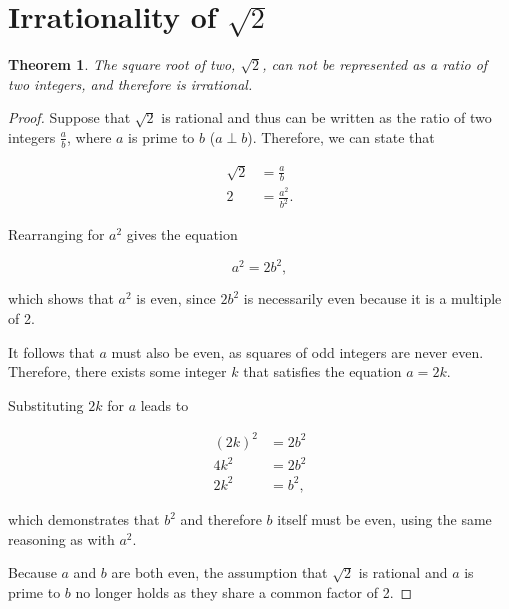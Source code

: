 \documentclass[parskip]{scrartcl}
\newtheorem{theorem}{Theorem}
\begin{document}
\section{Irrationality of \(\sqrt{2}\)}

\begin{theorem}
The square root of two, \(\sqrt{2}\), can not be represented as a ratio of two
integers, and therefore is irrational.
\end{theorem}

\begin{proof}
Suppose that \(\sqrt{2}\) is rational and thus can be written as the ratio of
two integers \(\frac{a}{b}\), where \(a\) is prime to \(b\) (\(a ⟂
b\)). Therefore, we can state that

\begin{align*}
  \sqrt{2} &= \frac{a}{b} \\
  2 &= \frac{a^2}{b^2}.
\end{align*}

Rearranging for \(a^2\) gives the equation

\begin{equation*}
  a^2 = 2b^2,
\end{equation*}

which shows that \(a^2\) is even, since \(2b^2\) is necessarily even because it
is a multiple of 2.

It follows that \(a\) must also be even, as squares of odd integers are never
even. Therefore, there exists some integer \(k\) that satisfies the equation \(a
= 2k\).

Substituting \(2k\) for \(a\) leads to

\begin{align*}
  {(2k)}^2 &= 2b^2 \\
  4k^2 &= 2b^2 \\
  2k^2 &= b^2,
\end{align*}

which demonstrates that \(b^2\) and therefore \(b\) itself must be even, using
the same reasoning as with \(a^2\).

Because \(a\) and \(b\) are both even, the assumption that \(\sqrt{2}\) is
rational and \(a\) is prime to \(b\) no longer holds as they share a common
factor of 2.
\end{proof}
\end{document}
